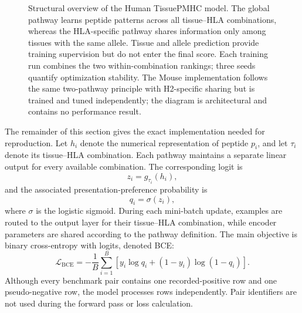 \begin{figure}[t]
\centering
{}
\caption{Structural overview of the Human TissuePMHC model. The global pathway learns peptide patterns across all tissue--HLA combinations, whereas the HLA-specific pathway shares information only among tissues with the same allele. Tissue and allele prediction provide training supervision but do not enter the final score. Each training run combines the two within-combination rankings; three seeds quantify optimization stability. The Mouse implementation follows the same two-pathway principle with H2-specific sharing but is trained and tuned independently; the diagram is architectural and contains no performance result.}
\label{fig:tissuepmhc-architecture}
\end{figure}

The remainder of this section gives the exact implementation needed for reproduction. Let \(h_i\) denote the numerical representation of peptide \(p_i\), and let \(\tau_i\) denote its tissue--HLA combination. Each pathway maintains a separate linear output for every available combination. The corresponding logit is
\[
z_i=g_{\tau_i}(h_i),
\]
and the associated presentation-preference probability is
\[
q_i=\sigma(z_i),
\]
where \(\sigma\) is the logistic sigmoid. During each mini-batch update, examples are routed to the output layer for their tissue--HLA combination, while encoder parameters are shared according to the pathway definition. The main objective is binary cross-entropy with logits, denoted BCE:
\[
\mathcal{L}_{\mathrm{BCE}}
=
-\frac{1}{B}
\sum_{i=1}^{B}
\left[
y_i\log q_i+(1-y_i)\log(1-q_i)
\right].
\]
Although every benchmark pair contains one recorded-positive row and one pseudo-negative row, the model processes rows independently. Pair identifiers are not used during the forward pass or loss calculation.

